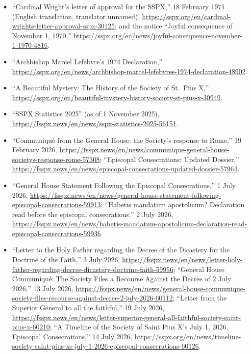 \begin{itemize}
\item ``Cardinal Wright's letter of approval for the SSPX,'' 18 February
1971 (English translation, translator unnamed),
\url{https://sspx.org/en/cardinal-wrights-letter-approval-sspx-30125};
and the notice ``Joyful consequence of November 1, 1970,''
\url{https://sspx.org/en/news/joyful-consequence-november-1-1970-4816}.
\item ``Archbishop Marcel Lefebvre's 1974 Declaration,''
\url{https://sspx.org/en/news/archbishop-marcel-lefebvres-1974-declaration-48902}.
\item ``A Beautiful Mystery: The History of the Society of St.\ Pius
X,''
\url{https://sspx.org/en/beautiful-mystery-history-society-st-pius-x-30949}.
\item ``SSPX Statistics 2025'' (as of 1 November 2025),
\url{https://fsspx.news/en/news/sspx-statistics-2025-56151}.
\item ``Communiqué from the General House: the Society's response to
Rome,'' 19 February 2026,
\url{https://fsspx.news/en/news/communique-general-house-societys-response-rome-57308};
``Episcopal Consecrations: Updated Dossier,''
\url{https://fsspx.news/en/news/episcopal-consecrations-updated-dossier-57964}.
\item ``General House Statement Following the Episcopal Consecrations,''
1 July 2026,
\url{https://fsspx.news/en/news/general-house-statement-following-episcopal-consecrations-59913};
``\guillemotleft Habetis mandatum apostolicum? \guillemotright{}
Declaration read before the episcopal consecrations,'' 2 July 2026,
\url{https://fsspx.news/en/news/habetis-mandatum-apostolicum-declaration-read-episcopal-consecrations-59936}.
\item ``Letter to the Holy Father regarding the Decree of the Dicastery
for the Doctrine of the Faith,'' 3 July 2026,
\url{https://fsspx.news/en/news/letter-holy-father-regarding-decree-dicastery-doctrine-faith-59956};
``General House Communiqué: The Society Files a Recourse Against the
Decree of 2 July 2026,'' 13 July 2026,
\url{https://fsspx.news/en/news/general-house-communique-society-files-recourse-against-decree-2-july-2026-60112};
``Letter from the Superior General to all the faithful,'' 19 July 2026,
\url{https://fsspx.news/en/news/letter-superior-general-all-faithful-society-saint-pius-x-60210};
``A Timeline of the Society of Saint Pius X's July 1, 2026, Episcopal
Consecrations,'' 14 July 2026,
\url{https://sspx.org/en/news/timeline-society-saint-pius-xs-july-1-2026-episcopal-consecrations-60126}.
\end{itemize}

